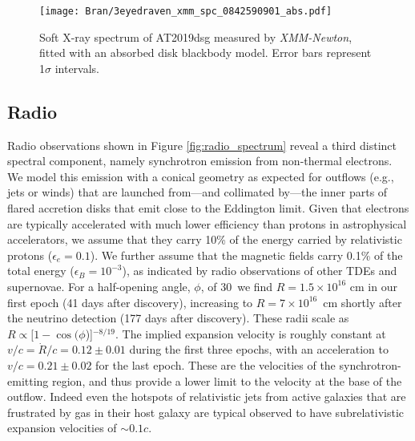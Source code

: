 \begin{figure*}
	\centering
	\texttt{[image: Bran/3eyedraven\_xmm\_spc\_0842590901\_abs.pdf]}
	\caption{Soft X-ray spectrum of AT2019dsg measured by \textit{XMM-Newton}, fitted with an absorbed disk blackbody model. Error bars represent 1$\sigma$ intervals.}
	\label{fig:xrayspec}
\end{figure*}

\subsection{Radio}

Radio observations shown in Figure \ref{fig:radio_spectrum} reveal a third distinct spectral component, namely synchrotron emission from non-thermal electrons. We model this emission with a  conical geometry as expected for outflows (e.g., jets or winds) that are launched from---and collimated by---the inner parts of flared accretion disks that emit close to the Eddington limit.
Given that electrons are typically accelerated with much lower efficiency than protons in astrophysical accelerators\cite{2012A&A...538A..81M}, we assume that they carry 10\% of the energy carried by relativistic protons ($\epsilon_{e} = 0.1$). We further assume that the magnetic fields carry 0.1\% of the total energy ($\epsilon_{B} = 10^{-3}$), as indicated by radio observations of other TDEs\cite{2018ApJ...854...86E} and supernovae\cite{2013MNRAS.436.1258H}. For a half-opening angle, $\phi$, of 30\arcdeg\ we find $R = 1.5 \times 10^{16}$ cm in our first epoch (41 days after discovery), increasing to $R = 7 \times 10^{16}$~cm shortly after the neutrino detection (177 days after discovery).  These radii scale\cite{2013ApJ...772...78B} as $R \propto [1-\cos(\phi$)]$^{-8/19}$. The implied expansion velocity is roughly constant at $v/c = \dot{R}/c = 0.12 \pm 0.01 $ during the first three epochs, with an acceleration to $v/c = 0.21 \pm0.02$ for the last epoch.  These are the velocities of the synchrotron-emitting region, and thus provide a lower limit to the velocity at the base of the outflow.  Indeed even the hotspots of relativistic jets from active galaxies that are frustrated by gas in their host galaxy are typical observed\cite{2003PASA...20...69P} to have subrelativistic expansion velocities of $\sim0.1c$. 


